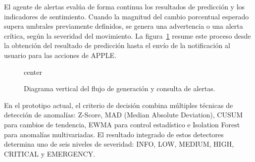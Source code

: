 El agente de alertas evalúa de forma continua los resultados de predicción y los
indicadores de sentimiento. Cuando la magnitud del cambio porcentual esperado
supera umbrales previamente definidos, se genera una advertencia o una alerta
crítica, según la severidad del movimiento. La figura~\ref{fig:flujo-alertas}
resume este proceso desde la obtención del resultado de predicción hasta el envío
de la notificación al usuario para las acciones de APPLE.


\begin{figure}[H]
  \centering
  \begin{adjustbox}{center}
  \end{adjustbox}

  \caption{Diagrama vertical del flujo de generación y consulta de alertas.}
  \label{fig:flujo-alertas}
  \end{figure}

En el prototipo actual, el criterio de decisión combina múltiples técnicas de detección de 
  anomalías: Z-Score, MAD (Median Absolute Deviation), CUSUM para cambios de tendencia, EWMA  
  para control estadístico e Isolation Forest para anomalías multivariadas. El resultado      
  integrado de estos detectores determina uno de seis niveles de severidad: INFO, LOW, MEDIUM,   HIGH, CRITICAL y EMERGENCY. 
  
